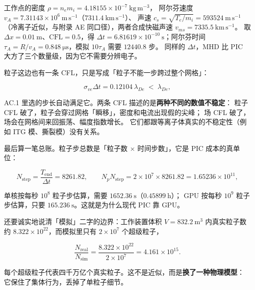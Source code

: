工作点的密度 $\rho=n_em_i=4.18155\times10^{-7}\ \mathrm{kg\,m^{-3}}$，
阿尔芬速度 $v_A=7.31143\times10^{6}\ \mathrm{m\,s^{-1}}$（$7311.4\ \mathrm{km\,s^{-1}}$）、
声速 $c_s=\sqrt{T_e/m_i}=593524\ \mathrm{m\,s^{-1}}$（冷离子近似，与附录 AE 同口径），两者合成快磁声速 $v_{ms}=7335.5\ \mathrm{km\,s^{-1}}$。
取 $\Delta x=0.01\ \mathrm{m}$、$\mathrm{CFL}=0.5$，得
$\Delta t=6.81619\times10^{-10}\ \mathrm{s}$；阿尔芬时间
$\tau_A=R/v_A=0.848\ \mathrm{\mu s}$，模拟 $10\tau_A$ 需要 $12440.8$ 步。
同样的 $\Delta t$，MHD 比 PIC 大方了三个数量级，因为它不需要分辨电子。

粒子这边也有一条 CFL，只是写成「粒子不能一步跨过整个网格」：

\begin{equation}
\sigma_{ve}\Delta t=0.12104\ \lambda_{De}\;<\;\lambda_{De},
\label{eq:app-ac-pcfl}
\end{equation}

AC.1 里选的步长自动满足它。两条 CFL 描述的是\textbf{两种不同的数值不稳定}：
粒子 CFL 破了，粒子会穿过网格「瞬移」，密度和电流出现假的尖峰；
场 CFL 破了，场会在网格间来回振荡、幅度指数增长。
它们都跟等离子体真实的不稳定性（例如 ITG 模、撕裂模）没有关系。

最后算一笔总账。粒子步总数是「粒子数 $\times$ 时间步数」，它是 PIC 成本的真单位：

\begin{equation}
N_{\mathrm{step}}=\frac{T_{\mathrm{end}}}{\Delta t}=8261.82,
\qquad
N_pN_{\mathrm{step}}=2\times10^{7}\times8261.82=1.65236\times10^{11},
\label{eq:app-ac-cost}
\end{equation}

单核按每秒 $10^{8}$ 粒子步估算，需要 $1652.36\ \mathrm{s}$（$0.45899\ \mathrm{h}$）；
GPU 按每秒 $10^{9}$ 粒子步估算，只要 $165.236\ \mathrm{s}$。这就是为什么现代 PIC 靠 GPU。

还要诚实地说清「模拟」二字的边界：工作装置体积 $V=832.2\ \mathrm{m^3}$ 内真实粒子数约
$8.322\times10^{22}$，而模拟里只有 $2\times10^{7}$ 个超级粒子，

\begin{equation}
\frac{N_{\mathrm{real}}}{N_{\mathrm{sim}}}=\frac{8.322\times10^{22}}{2\times10^{7}}
=4.161\times10^{15}.
\label{eq:app-ac-scalegap}
\end{equation}

每个超级粒子代表四千万亿个真实粒子。这不是近似，而是\textbf{换了一种物理模型}：
它保住了集体行为，丢掉了单粒子细节。

